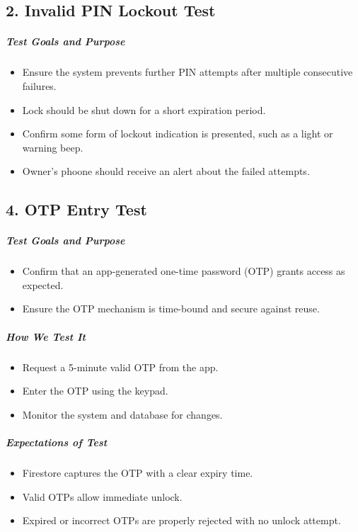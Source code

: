 \newpage
\subsection*{2. Invalid PIN Lockout Test}
\subparagraph{Test Goals and Purpose}
\begin{itemize}
    \item Ensure the system prevents further PIN attempts after multiple consecutive failures.
    \item Lock should be shut down for a short expiration period.
    \item Confirm some form of lockout indication is presented, such as a light or warning beep.
    \item Owner's phoone should receive an alert about the failed attempts.
\end{itemize}

\subsection*{4. OTP Entry Test}
\subparagraph{Test Goals and Purpose}
\begin{itemize}
    \item Confirm that an app-generated one-time password (OTP) grants access as expected.
    \item Ensure the OTP mechanism is time-bound and secure against reuse.
\end{itemize}
\subparagraph{How We Test It}
\begin{itemize}
    \item Request a 5-minute valid OTP from the app.
    \item Enter the OTP using the keypad.
    \item Monitor the system and database for changes.
\end{itemize}
\subparagraph{Expectations of Test}
\begin{itemize}
    \item Firestore captures the OTP with a clear expiry time.
    \item Valid OTPs allow immediate unlock.
    \item Expired or incorrect OTPs are properly rejected with no unlock attempt.
\end{itemize}

